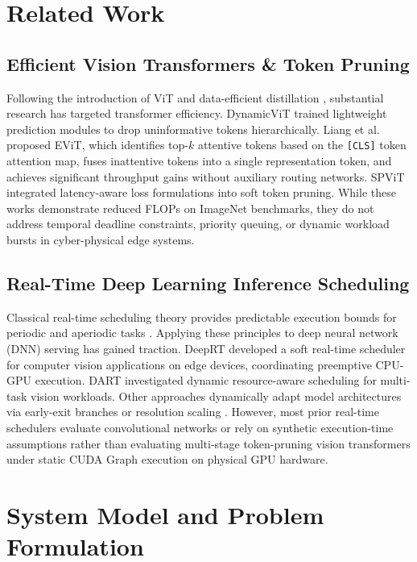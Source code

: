 \documentclass[conference]{IEEEtran}
\begin{document}
\section{Related Work}

\subsection{Efficient Vision Transformers \& Token Pruning}
Following the introduction of ViT \cite{dosovitskiy2021image} and data-efficient distillation \cite{touvron2021training}, substantial research has targeted transformer efficiency. DynamicViT \cite{rao2021dynamicvit} trained lightweight prediction modules to drop uninformative tokens hierarchically. Liang et al.\ \cite{liang2022not} proposed EViT, which identifies top-$k$ attentive tokens based on the \texttt{[CLS]} token attention map, fuses inattentive tokens into a single representation token, and achieves significant throughput gains without auxiliary routing networks. SPViT \cite{kong2022spvit} integrated latency-aware loss formulations into soft token pruning. While these works demonstrate reduced FLOPs on ImageNet benchmarks, they do not address temporal deadline constraints, priority queuing, or dynamic workload bursts in cyber-physical edge systems.

\subsection{Real-Time Deep Learning Inference Scheduling}
Classical real-time scheduling theory provides predictable execution bounds for periodic and aperiodic tasks \cite{buttazzo2011hard}. Applying these principles to deep neural network (DNN) serving has gained traction. DeepRT \cite{zhang2021deeprt} developed a soft real-time scheduler for computer vision applications on edge devices, coordinating preemptive CPU-GPU execution. DART \cite{le2022dart} investigated dynamic resource-aware scheduling for multi-task vision workloads. Other approaches dynamically adapt model architectures via early-exit branches \cite{teerapittayanon2016branchynet} or resolution scaling \cite{yang2020resolution}. However, most prior real-time schedulers evaluate convolutional networks or rely on synthetic execution-time assumptions rather than evaluating multi-stage token-pruning vision transformers under static CUDA Graph execution on physical GPU hardware.

\section{System Model and Problem Formulation}
\end{document}

